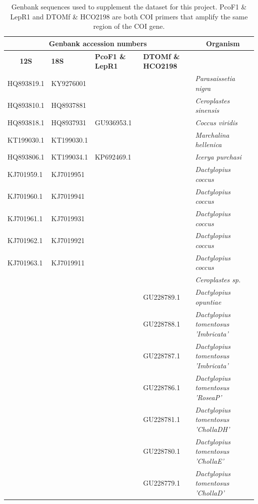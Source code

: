 \begin{landscape}
\begin{table}[H]
\caption{Genbank sequences used to supplement the dataset for this project. PcoF1 \& LepR1 and DTOMf \& HCO2198 are both COI primers that amplify the same region of the COI gene.} \label{appendix:outgroups}
\centering
{\scriptsize %
\renewcommand{\arraystretch}{0.4}
\begin{tabular}{@{}lllll@{}} \\ \toprule
\multicolumn{4}{c}{\textbf{Genbank accession numbers}} & \multicolumn{1}{c}{\textbf{Organism}}  \\ \toprule
\multicolumn{1}{c}{\textbf{12S}} & \textbf{18S} & \textbf{PcoF1 \& LepR1} & \textbf{DTOMf \& HCO2198} &  \\ \bottomrule
HQ893819.1 & KY9276001 &  &  & \textit{Parasaissetia nigra} \\
HQ893810.1 & HQ8937881 &  &  & \textit{Ceroplastes sinensis} \\
HQ893818.1 & HQ8937931 & GU936953.1 &  & \textit{Coccus viridis} \\
KT199030.1 & KT199030.1 &  &  & \textit{Marchalina hellenica} \\
HQ893806.1 & KT199034.1 & KP692469.1 &  & \textit{Icerya purchasi} \\
KJ701959.1 & KJ7019951 &  &  & \textit{Dactylopius coccus} \\
KJ701960.1 & KJ7019941 &  &  & \textit{Dactylopius coccus} \\
KJ701961.1 & KJ7019931 &  &  & \textit{Dactylopius coccus} \\
KJ701962.1 & KJ7019921 &  &  & \textit{Dactylopius coccus} \\
KJ701963.1 & KJ7019911 &  &  & \textit{Dactylopius coccus} \\
 &  &  &  & \textit{Ceroplastes sp.} \\
 &  &  & GU228789.1 & \textit{Dactylopius opuntiae} \\
 &  &  & GU228788.1 & \textit{Dactylopius tomentosus 'Imbricata'} \\
 &  &  & GU228787.1 & \textit{Dactylopius tomentosus 'Imbricata'} \\
 &  &  & GU228786.1 & \textit{Dactylopius tomentosus 'RoseaP'} \\
 &  &  & GU228781.1 & \textit{Dactylopius tomentosus 'ChollaDH'} \\
 &  &  & GU228780.1 & \textit{Dactylopius tomentosus 'ChollaE'} \\
 &  &  & GU228779.1 & \textit{Dactylopius tomentosus 'ChollaD'} \\

\end{tabular}}
\end{table}
\end{landscape}

